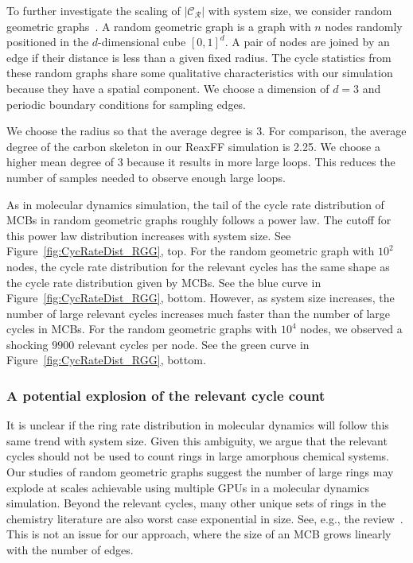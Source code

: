 \documentclass[fleqn,11pt]{article}
\newcommand\RelCyc{\mathcal{C_R}} %
\begin{document}
To further investigate the scaling of $|\RelCyc|$ with system size, we consider random geometric graphs~\cite{penroseRandom2003}. A random geometric graph is a graph with $n$ nodes randomly positioned in the $d$-dimensional cube $[0,1]^d$. A pair of nodes are joined by an edge if their distance is less than a given fixed radius. The cycle statistics from these random graphs share some qualitative characteristics with our simulation because they have a spatial component. We choose a dimension of $d=3$ and periodic boundary conditions for sampling edges. 

We choose the radius so that the average degree is 3. For comparison, the average degree of the carbon skeleton in our ReaxFF simulation is 2.25. We choose a higher mean degree of 3 because it results in more large loops. This reduces the number of samples needed to observe enough large loops.

As in molecular dynamics simulation, the tail of the cycle rate distribution of MCBs in random geometric graphs roughly follows a power law. The cutoff for this power law distribution increases with system size. See Figure~\ref{fig:CycRateDist_RGG}, top. For the random geometric graph with $10^2$ nodes, the cycle rate distribution for the relevant cycles has the same shape as the cycle rate distribution given by MCBs. See the blue curve in Figure~\ref{fig:CycRateDist_RGG}, bottom. However, as system size increases, the number of large relevant cycles increases much faster than the number of large cycles in MCBs. For the random geometric graphs with $10^4$ nodes, we observed a shocking $9900$ relevant cycles per node. See the green curve in Figure~\ref{fig:CycRateDist_RGG}, bottom.

\subsubsection{A potential explosion of the relevant cycle count}

It is unclear if the ring rate distribution in molecular dynamics will follow this same trend with system size.
Given this ambiguity, we argue that the relevant cycles should not be used to count rings in large amorphous chemical systems. Our studies of random geometric graphs suggest the number of large rings may explode at scales achievable using multiple GPUs in a molecular dynamics simulation. Beyond the relevant cycles, many other unique sets of rings in the chemistry literature are also worst case exponential in size. See, e.g., the review~\cite{bergerCounterexamples2004}. This is not an issue for our approach, where the size of an MCB grows linearly with the number of edges.
\end{document}
